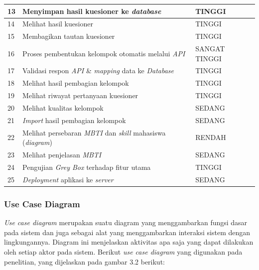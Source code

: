 \begin{longtable}{| b{}|p{}|p{}|}
	\hline
	13          & Menyimpan hasil kuesioner ke \textit{database}                                   & TINGGI             \\
	\hline
	14          & Melihat hasil kuesioner                                                          & TINGGI             \\
	\hline
	15          & Membagikan tautan kuesioner                                                      & TINGGI             \\
	\hline
	16          & Proses pembentukan kelompok otomatis melalui \textit{API}                        & SANGAT TINGGI      \\
	\hline
	17          & Validasi respon \textit{API} \& \textit{mapping} data ke \textit{Database}       & TINGGI             \\
	\hline
	18          & Melihat hasil pembagian kelompok                                                 & TINGGI             \\
	\hline
	19          & Melihat riwayat pertanyaan kuesioner                                             & TINGGI             \\
	\hline
	20          & Melihat kualitas kelompok                                                        & SEDANG             \\
	\hline
	21          & \textit{Import} hasil pembagian kelompok                                         & SEDANG             \\
	\hline
	22          & Melihat persebaran \textit{MBTI} dan \textit{skill} mahasiswa (\textit{diagram}) & RENDAH             \\
	\hline
	23          & Melihat penjelasan \textit{MBTI}                                                 & SEDANG             \\
	\hline
	24          & Pengujian \textit{Grey Box} terhadap fitur utama                                 & TINGGI             \\
	\hline
	25          & \textit{Deployment} aplikasi ke \textit{server}                                  & SEDANG             \\
	\hline
\end{longtable}

\subsubsection{Use Case Diagram}
\textit{Use case diagram} merupakan suatu diagram yang menggambarkan fungsi dasar pada sistem dan juga sebagai alat yang menggambarkan interaksi sistem dengan lingkungannya. Diagram ini menjelaskan aktivitas apa saja yang dapat dilakukan oleh setiap aktor pada sistem. Berikut \textit{use case diagram} yang digunakan pada penelitian, yang dijelaskan pada gambar 3.2 berikut:

